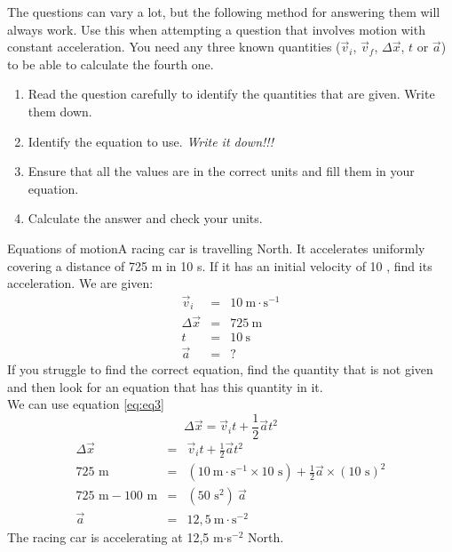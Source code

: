      \label{m38796*id76069}The questions can vary a lot, but the following method for answering them will always work. Use this when attempting a question that involves motion with constant acceleration. You need any three known quantities ($\vec{v}_{i}$, $\vec{v}_{f}$, $\Delta \vec{x}$, $t$ or $\vec{a}$) to be able to calculate the fourth one.\par 
      \label{m38796*id76133}\begin{enumerate}[noitemsep, label=\textbf{\arabic*}. ] 
            \label{m38796*uid130}\item Read the question carefully to identify the quantities that are given. Write them down.
\label{m38796*uid131}\item Identify the equation to use. \textsl{Write it down!!!}\label{m38796*uid132}\item Ensure that all the values are in the correct units and fill them in your equation.
\label{m38796*uid133}\item Calculate the answer and check your units.
\end{enumerate}
\pagebreak
\begin{wex}{Equations of motion}{A racing car is travelling North. It accelerates uniformly  covering a distance of 725 m in 10 s. If it has an initial velocity of 10 \ms, find its acceleration.}
{ We are given:
\begin{eqnarray*}
\vec{v}_i&=&10\ \text{m} \cdot \text{s}^{-1}\\
\Delta \vec{x}&=&725\ \text{m}\\
t&=&10\ \text{s}\\
\vec{a}&=&?
\end{eqnarray*}
If you struggle to find the correct equation, find the quantity that is not given and then look for an equation that has this quantity in it.\\
We can use equation \ref{eq:eq3}
\begin{displaymath}
\Delta \vec{x}=\vec{v}_it +\frac{1}{2}\vec{a}t^2
\end{displaymath}
\begin{eqnarray*}
\Delta \vec{x} &=& \vec{v}_it +\frac{1}{2}\vec{a}t^2\\
725\text{~m} &=& (10~\text{m}\cdot \text{s}^{-1} \times 10\text{~s}) + \frac{1}{2} \vec{a} \times (10\text{~s})^2\\
725\text{~m} - 100\text{~m} &=& (50\text{~s}^2)~ \vec{a}\\
\vec{a} &=& 12,5~ \text{m} \cdot\text{s}^{-2}
\end{eqnarray*}
The racing car is accelerating at 12,5 m$\cdot$s$^{-2}$ North.}
\end{wex}
